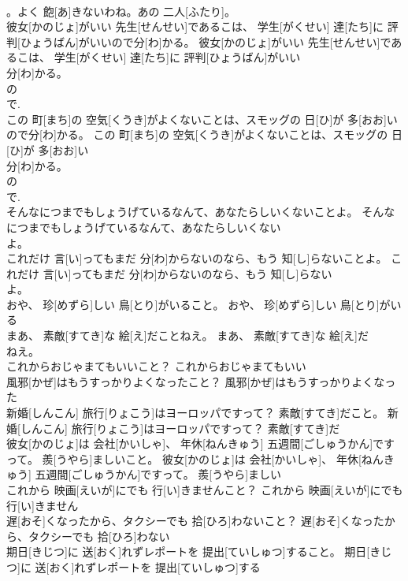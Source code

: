 \documentclass[8pt]{extreport}
\begin{document}
\begin{CJK}{UTF8}{min}
\\	。よく 飽[あ]きないわね。あの 二人[ふたり]。	
\\	彼女[かのじょ]がいい 先生[せんせい]であるこは、 学生[がくせい] 達[たち]に 評判[ひょうばん]がいいので分[わ]かる。	彼女[かのじょ]がいい 先生[せんせい]であるこは、 学生[がくせい] 達[たち]に 評判[ひょうばん]がいい
\\	分[わ]かる。	
\\	の 
\\	で.
\\	この 町[まち]の 空気[くうき]がよくないことは、スモッグの 日[ひ]が 多[おお]いので分[わ]かる。	この 町[まち]の 空気[くうき]がよくないことは、スモッグの 日[ひ]が 多[おお]い
\\	分[わ]かる。	
\\	の 
\\	で.
\\	そんなにつまでもしょうげているなんて、あなたらしいくないことよ。	そんなにつまでもしょうげているなんて、あなたらしいくない
\\	よ。	
\\	これだけ 言[い]ってもまだ 分[わ]からないのなら、もう 知[し]らないことよ。	これだけ 言[い]ってもまだ 分[わ]からないのなら、もう 知[し]らない
\\	よ。	
\\	おや、 珍[めずら]しい 鳥[とり]がいること。	おや、 珍[めずら]しい 鳥[とり]がいる
\\	まあ、 素敵[すてき]な 絵[え]だことねえ。	まあ、 素敵[すてき]な 絵[え]だ
\\	ねえ。	
\\	これからおじゃまてもいいこと？	これからおじゃまてもいい
\\	風邪[かぜ]はもうすっかりよくなったこと？	風邪[かぜ]はもうすっかりよくなった
\\	新婚[しんこん] 旅行[りょこう]はヨーロッパですって？ 素敵[すてき]だこと。	新婚[しんこん] 旅行[りょこう]はヨーロッパですって？ 素敵[すてき]だ
\\	彼女[かのじょ]は 会社[かいしゃ]、 年休[ねんきゅう] 五週間[ごしゅうかん]ですって。 羨[うやら]ましいこと。	彼女[かのじょ]は 会社[かいしゃ]、 年休[ねんきゅう] 五週間[ごしゅうかん]ですって。 羨[うやら]ましい
\\	これから 映画[えいが]にでも 行[い]きませんこと？	これから 映画[えいが]にでも 行[い]きません
\\	遅[おそ]くなったから、タクシーでも 拾[ひろ]わないこと？	遅[おそ]くなったから、タクシーでも 拾[ひろ]わない
\\	期日[きじつ]に 送[おく]れずレポートを 提出[ていしゅつ]すること。	期日[きじつ]に 送[おく]れずレポートを 提出[ていしゅつ]する

\end{CJK}
\end{document}
